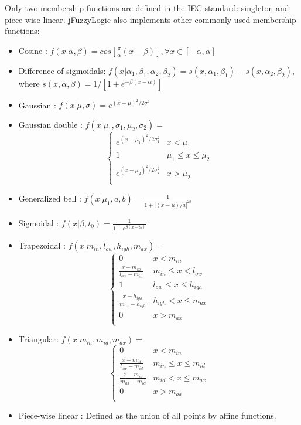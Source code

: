 \documentclass[11pt,twoside]{article}
\begin{document}
\begin{multicols}{2}
Only two membership functions are defined in the IEC standard: singleton and piece-wise linear.
jFuzzyLogic also implements other commonly used membership functions: 
\begin{itemize}
	\item Cosine : $ f(x | \alpha, \beta) = cos[\frac{\pi}{\alpha}(x - \beta)] , \forall x \in [-\alpha, \alpha]$
	\item Difference of sigmoidals: $f(x| \alpha_1, \beta_1, \alpha_2, \beta_2) = s(x,\alpha_1, \beta_1) - s(x,\alpha_2, \beta_2)$, where $s(x,\alpha, \beta) = 1 / [1+e^{-\beta (x-\alpha)}]$
	\item Gaussian : $f(x | \mu, \sigma) = e^{(x-\mu)^2 / 2 \sigma^2}$
	\item Gaussian double : $f(x | \mu_1, \sigma_1,\mu_2, \sigma_2) = $
\[
\left\lbrace \begin{array}{lr}
e^{(x-\mu_1)^2 / 2 \sigma_1^2} & x < \mu_1 \\
1 & \mu_1 \le x \le \mu_2 \\
e^{(x-\mu_2)^2 / 2 \sigma_2^2} & x > \mu_2 \\
\end{array}  \right.
\]
	\item Generalized bell : $f(x |\mu_1,a,b) = \frac{1}{1 + |(x-\mu)/a|^{2b}}$
	\item Sigmoidal : $f(x |\beta, t_0) = \frac{1}{1 + e^{\beta(x-t_0)}}$
	\item Trapezoidal : $f(x | m_{in}, l_{ow}, h_{igh}, m_{ax}) = $
\[
\left\lbrace \begin{array}{lr}
0 & x < m_{in} \\
\frac{x - m_{in} }{l_{ow} - m_{in} } & m_{in} \le x < l_{ow} \\
1 & l_{ow} \le x \le h_{igh} \\
\frac{x - h_{igh} }{m_{ax} - h_{igh} } & h_{igh} < x \le m_{ax} \\
0 & x > m_{ax} \\
\end{array}  \right.
\]
	\item Triangular: $f(x | m_{in}, m_{id}, m_{ax}) = $
\[
\left\lbrace \begin{array}{lr}
0 & x < m_{in} \\
\frac{x -m_{id} }{l_{ow} - m_{id} } & m_{in} \le x \le m_{id} \\
\frac{x - m_{id} }{m_{ax} - m_{id} } & m_{id} < x \le m_{ax} \\
0 & x > m_{ax} \\
\end{array}  \right.
\]
	\item Piece-wise linear : Defined as the union of all points by affine functions.
\end{itemize}


\end{multicols}
\end{document}
